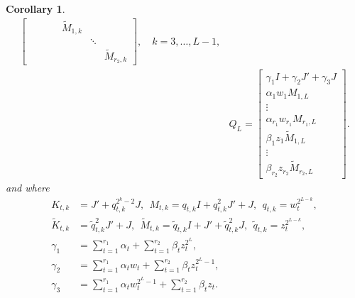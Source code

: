 \documentclass[a4paper]{article}
\newtheorem{corollary}{Corollary}[section]
\newcommand{\LL}{L}
\newcommand{\KK}{K}
\newcommand{\KKother}{\widetilde{K}}
\newcommand{\MM}{M}
\newcommand{\MMother}{\widetilde{M}}
\newcommand{\qq}{\widetilde{q}}
\begin{document}
\begin{corollary}
\[\begin{split}
\begin{bmatrix}
         & & & & \MMother_{1,k} & & \\
         & & & & & \ddots & \\ 
         & & & & &        & \MMother_{r_2,k}
    \end{bmatrix}, 
    \quad k =3,\dots,\LL-1, \\
    &Q_\LL = 
    \begin{bmatrix}
        \gamma_1 I + \gamma_2 J' + \gamma_3 J \\
        \alpha_1 w_1 \MM_{1,\LL}\\
        \vdots \\
        \alpha_{r_1} w_{r_1} \MM_{r_1,\LL} \\
        \beta_{1} z_{1} \MMother_{1,\LL}\\
        \vdots \\
        \beta_{r_2} z_{r_2} \MMother_{r_2,\LL}
    \end{bmatrix}.
    \end{split}
    \]
    and where 
    \begin{align*}
        \KK_{t,k} 
        &=
        J' + q_{t,k}^{2^{k}-2} J,~~
        \MM_{t,k} = q_{t,k}I + q_{t,k}^2 J' + J,~~
        q_{t,k} = w_t^{2^{\LL-k}},\\
        \KKother_{t,k} 
        &=
        \qq_{t,k}^2 J' + J,~~
        \MMother_{t,k} = \qq_{t,k} I + J' + \qq_{t,k}^{2} J,~~
        \qq_{t,k} = z_t^{2^{\LL-k}},\\
        \gamma_1 
        &=
        \sum_{t=1}^{r_1} \alpha_t + \sum_{t=1}^{r_2} \beta_t z_t^{2^\LL}, \\
        \gamma_2
        &=
        \sum_{t=1}^{r_1} \alpha_t w_{t}
        +
        \sum_{t=1}^{r_2} \beta_t z_t^{2^{\LL}-1}, \\
        \gamma_3 
        &=
        \sum_{t=1}^{r_1} \alpha_t w_{t}^{2^{\LL}-1} 
        +
        \sum_{t=1}^{r_2} \beta_t z_t.
    \end{align*}
\end{corollary}
\end{document}

